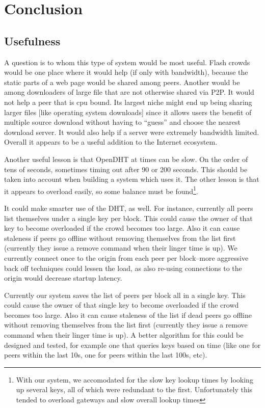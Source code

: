 
\section{Conclusion}
\subsection{Usefulness}
A question is to whom this type of system would be most useful.  Flash crowds would be one place where it would help (if only with bandwidth), because the static parts of a web page would be shared among peers.  Another would be among downloaders of large file that are not otherwise shared via P2P.  It would not help a peer that is cpu bound.  Its largest niche might end up being sharing larger files [like operating system downloads] since it allows users the benefit of multiple source download without having to ``guess'' and choose the nearest download server.  It would also help if a server were extremely bandwidth limited.  Overall it appears to be a useful addition to the Internet ecosystem.

Another useful lesson is that OpenDHT at times can be slow.  On the order of tens of seconds, sometimes timing out after 90 or 200 seconds.  This should be taken into account when building a system which uses it.  The other lesson is that it appears to overload easily, so some balance must be found\footnote{With our system, we accomodated for the slow key lookup times by looking up several keys, all of which were redundant to the first.  Unfortunately this tended to overload gateways and slow overall lookup times}.

It could make smarter use of the DHT, as well.  For instance, currently all peers list themselves under a single key per block.  This could cause the owner of that key to become overloaded if the crowd becomes too large.  Also it can cause staleness if peers go offline without removing themselves from the list first (currently they issue a remove command when their linger time is up).
We currently connect once to the origin from each peer per block--more aggressive back off techniques could lessen the load, as also re-using connections to the origin would decrease startup latency.


Currently our system saves the list of peers per block all in a single key.  This could cause the owner of that single key to become overloaded if the crowd becomes too large.  Also it can cause staleness of the list if dead peers go offline without removing themselves from the list
first (currently they issue a remove command when their linger time is up).  A better algorithm for this could be designed and tested, for example one that queries keys based on time (like one for peers within the last 10s, one for peers within the last 100s, etc).


